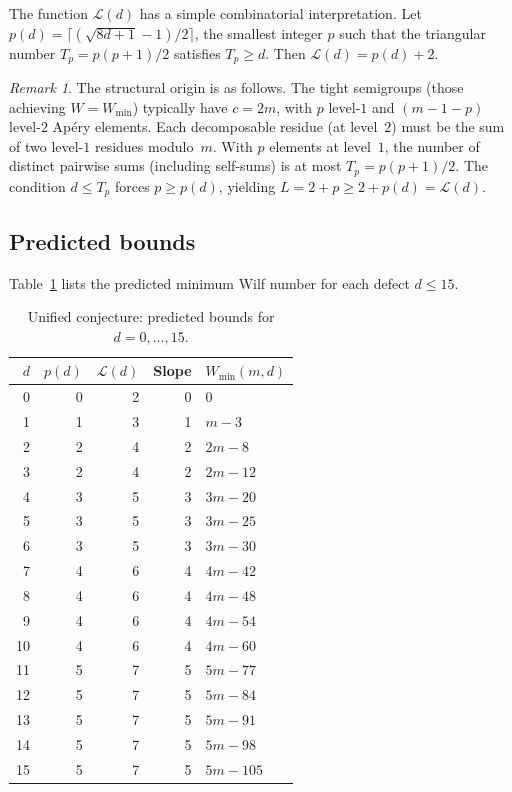 \documentclass[11pt]{amsart}
\theoremstyle{definition}
\theoremstyle{remark}
\newtheorem{remark}[theorem]{Remark}
\begin{document}
The function $\mathcal{L}(d)$ has a simple combinatorial interpretation.
Let $p(d) = \lceil (\sqrt{8d+1} - 1)/2 \rceil$, the smallest integer $p$
such that the triangular number $T_p = p(p+1)/2$ satisfies $T_p \ge d$.
Then $\mathcal{L}(d) = p(d) + 2$.

\begin{remark}
The structural origin is as follows.  The tight semigroups (those achieving
$W = W_{\min}$) typically have $c = 2m$, with $p$ level-$1$ and $(m - 1 - p)$
level-$2$ Ap\'ery elements.  Each decomposable residue (at level~$2$) must be the
sum of two level-$1$ residues modulo~$m$.
With $p$ elements at level~$1$, the number of distinct pairwise sums
(including self-sums) is at most $T_p = p(p+1)/2$.
The condition $d \le T_p$ forces $p \ge p(d)$, yielding
$L = 2 + p \ge 2 + p(d) = \mathcal{L}(d)$.
\end{remark}

\subsection{Predicted bounds}

Table~\ref{tab:conjecture} lists the predicted minimum Wilf number
for each defect $d \le 15$.

\begin{table}[ht]
\centering
\caption{Unified conjecture: predicted bounds for $d = 0, \ldots, 15$.}\label{tab:conjecture}
\begin{tabular}{rrrrl}
\toprule
$d$ & $p(d)$ & $\mathcal{L}(d)$ & Slope & $W_{\min}(m, d)$ \\
\midrule
0  & 0 & 2 & 0 & $0$ \\
1  & 1 & 3 & 1 & $m - 3$ \\
2  & 2 & 4 & 2 & $2m - 8$ \\
3  & 2 & 4 & 2 & $2m - 12$ \\
4  & 3 & 5 & 3 & $3m - 20$ \\
5  & 3 & 5 & 3 & $3m - 25$ \\
6  & 3 & 5 & 3 & $3m - 30$ \\
7  & 4 & 6 & 4 & $4m - 42$ \\
8  & 4 & 6 & 4 & $4m - 48$ \\
9  & 4 & 6 & 4 & $4m - 54$ \\
10 & 4 & 6 & 4 & $4m - 60$ \\
11 & 5 & 7 & 5 & $5m - 77$ \\
12 & 5 & 7 & 5 & $5m - 84$ \\
13 & 5 & 7 & 5 & $5m - 91$ \\
14 & 5 & 7 & 5 & $5m - 98$ \\
15 & 5 & 7 & 5 & $5m - 105$ \\
\bottomrule
\end{tabular}
\end{table}
\end{document}
